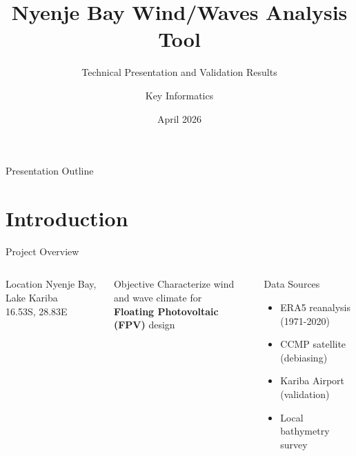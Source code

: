 \documentclass[10pt]{beamer}
\title{Nyenje Bay Wind/Waves Analysis Tool}
\subtitle{Technical Presentation and Validation Results}
\author{Key Informatics}
\institute{Lake Kariba, Zambia / Zimbabwe}
\date{April 2026}
\begin{document}
\begin{frame}
\titlepage
\end{frame}

\begin{frame}{Presentation Outline}
\tableofcontents
\end{frame}

\section{Introduction}

\begin{frame}{Project Overview}
\begin{columns}
\begin{block}{Location}
Nyenje Bay, Lake Kariba\\
\alert{16.53S, 28.83E}
\end{block}

\begin{block}{Objective}
Characterize wind and wave climate for\\
\textbf{Floating Photovoltaic (FPV)} design
\end{block}

\begin{block}{Data Sources}
\begin{itemize}
    \item ERA5 reanalysis (1971-2020)
    \item CCMP satellite (debiasing)
    \item Kariba Airport (validation)
    \item Local bathymetry survey
\end{itemize}
\end{block}
\end{columns}
\end{frame}
\end{document}
